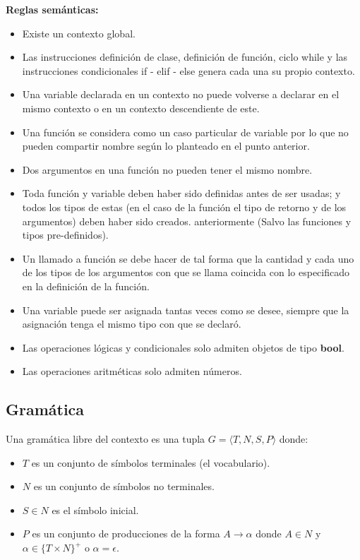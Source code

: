 \textbf{Reglas sem\'anticas:}
\begin{itemize}
	\item Existe un contexto global.
	\item Las instrucciones definici\'on de clase, definici\'on de funci\'on, ciclo while y las instrucciones condicionales if - elif - else genera cada una su propio contexto.
	\item Una variable declarada en un contexto no puede volverse a declarar en el mismo contexto o en un contexto descendiente de este.
	\item Una funci\'on se considera como un caso particular de variable por lo que no pueden compartir nombre seg\'un lo planteado en el punto anterior.  
	\item Dos argumentos en una funci\'on no pueden tener el mismo nombre.
	\item Toda funci\'on y variable deben haber sido definidas antes de ser usadas; y todos los tipos de estas (en el caso de la funci\'on el tipo de retorno y de los argumentos) deben haber sido creados. anteriormente (Salvo las funciones y tipos pre-definidos).
	\item Un llamado a funci\'on se debe hacer de tal forma que la cantidad y cada uno de los tipos de los argumentos con que se llama coincida con lo especificado en la definici\'on de la funci\'on.
	\item Una variable puede ser asignada tantas veces como se desee, siempre que la asignaci\'on tenga el mismo tipo con que se declar\'o.
	\item Las operaciones l\'ogicas y condicionales solo admiten objetos de tipo \textbf{bool}.
	\item Las operaciones aritm\'eticas solo admiten n\'umeros. 
\end{itemize}

\subsection{Gramática}

Una gramática libre del contexto es una tupla $G = \langle T, N, S, P \rangle$ donde:

\begin{itemize}
        \item $T$ es un conjunto de símbolos terminales (el vocabulario).
        \item $N$ es un conjunto de símbolos no terminales.
        \item $S \in N$ es el símbolo inicial.
        \item $P$ es un conjunto de producciones de la forma $A \rightarrow \alpha$  donde $A \in N$ y $\alpha \in \{T \times N\}^+$ o $\alpha = \epsilon$.
\end{itemize}

